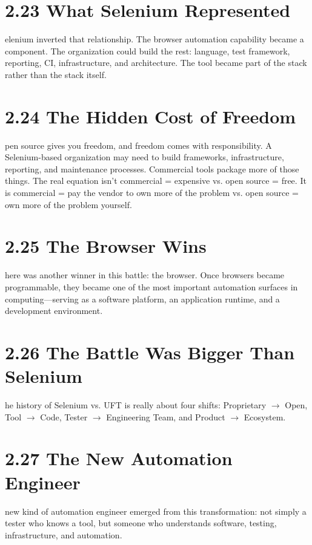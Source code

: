 \documentclass[11pt, a4paper, openany]{book}
\newcommand{\initialcap}[1]{{\fontfamily{lmss}\selectfont\huge\textbf{#1}}}
\begin{document}
\section{2.23 What Selenium Represented}
\noindent \initialcap{S}elenium inverted that relationship. The browser automation capability became a component. The organization could build the rest: language, test framework, reporting, CI, infrastructure, and architecture. The tool became part of the stack rather than the stack itself.

\section{2.24 The Hidden Cost of Freedom}
\noindent \initialcap{O}pen source gives you freedom, and freedom comes with responsibility. A Selenium-based organization may need to build frameworks, infrastructure, reporting, and maintenance processes. Commercial tools package more of those things. The real equation isn't commercial = expensive vs. open source = free. It is commercial = pay the vendor to own more of the problem vs. open source = own more of the problem yourself.

\section{2.25 The Browser Wins}
\noindent \initialcap{T}here was another winner in this battle: the browser. Once browsers became programmable, they became one of the most important automation surfaces in computing---serving as a software platform, an application runtime, and a development environment.

\section{2.26 The Battle Was Bigger Than Selenium}
\noindent \initialcap{T}he history of Selenium vs. UFT is really about four shifts: Proprietary $\to$ Open, Tool $\to$ Code, Tester $\to$ Engineering Team, and Product $\to$ Ecosystem.

\section{2.27 The New Automation Engineer}
\noindent \initialcap{A} new kind of automation engineer emerged from this transformation: not simply a tester who knows a tool, but someone who understands software, testing, infrastructure, and automation.
\end{document}
